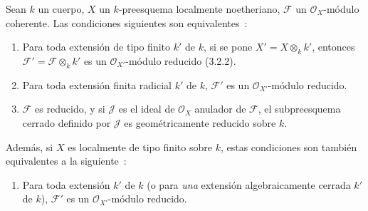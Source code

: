 \begin{proposition}[4.6.16]
\label{IV.2.4.6.16-fr}
Sean $k$ un cuerpo, $X$ un $k$-preesquema localmente noetheriano, $\mathscr F$
un $\mathcal O_X$-módulo coherente. Las condiciones siguientes son
equivalentes~:
\begin{enumerate}
\item[\textup{a)}] Para toda extensión de tipo finito $k'$ de $k$, si se pone
$X'=X\otimes_k k'$, entonces $\mathscr F'=\mathscr F\otimes_k k'$ es un
$\mathcal O_{X'}$-módulo reducido \textup{(3.2.2)}.
\item[\textup{b)}] Para toda extensión finita radicial $k'$ de $k$, $\mathscr F'$ es un
$\mathcal O_{X'}$-módulo reducido.
\item[\textup{c)}] $\mathscr F$ es reducido, y si $\mathscr J$ es el ideal de
$\mathcal O_X$ anulador de $\mathscr F$, el subpreesquema cerrado definido por
$\mathscr J$ es geométricamente reducido sobre $k$.
\end{enumerate}


Además, si $X$ es localmente de tipo finito sobre $k$, estas condiciones son
también equivalentes a la siguiente~:
\begin{enumerate}
\item[\textup{d)}] Para toda extensión $k'$ de $k$ \textup{(o} para \emph{una} extensión
algebraicamente cerrada $k'$ de $k$), $\mathscr F'$ es un
$\mathcal O_{X'}$-módulo reducido.
\end{enumerate}
\end{proposition}

